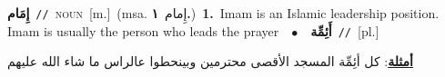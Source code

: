 \documentclass[10pt,a4paper,twoside]{article} %
\begin{document}
\begin{multicols}{2}
{\setlength\topsep{0pt}\textbf{\foreignlanguage{arabic}{إِمَام}}\ {\color{gray}\texttt{//}\color{black}}\ \textsc{noun}\ [m.]\ \color{gray}(msa. \foreignlanguage{arabic}{إِمام}~\foreignlanguage{arabic}{\textbf{١.}})\color{black}\ \textbf{1.}~Imam is an Islamic leadership position. Imam is usually the person who leads the prayer\ \ $\bullet$\ \ \setlength\topsep{0pt}\textbf{\foreignlanguage{arabic}{أَئِمِّة}}\ {\color{gray}\texttt{//}\color{black}}\ [pl.]\  \begin{flushright}\color{gray}\foreignlanguage{arabic}{\textbf{\underline{\foreignlanguage{arabic}{أمثلة}}}: كل أئِمِّة المسجد الأقصى محترمين وبينحطوا عالراس ما شاء الله عليهم}\end{flushright}\color{black}} \vspace{2mm}


\end{multicols}
\end{document}
